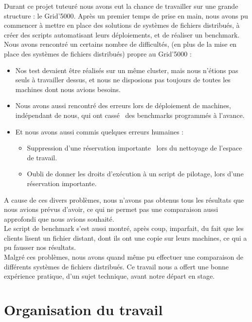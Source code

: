 \documentclass[12pt]{report}
\begin{document}
	Durant ce projet tuteuré nous avons eut la chance de travailler sur une grande structure : le Grid'5000.
	Après un premier temps de prise en main, nous avons pu commencer à mettre en place des solutions de systèmes de fichiers distribués,
	à créer des scripts automatisant leurs déploiements, et de réaliser un benchmark.\\

	Nous avons rencontré un certains nombre de difficultés, (en plus de la mise en place des systèmes de fichiers distribués) propre au Grid'5000 :
	\begin{itemize}
		\item Nos test devaient être réalisés sur un même cluster, mais nous n'étions pas seuls à travailler dessus,
		et nous ne disposions pas toujours de toutes les machines dont nous avions besoins.
		\item Nous avons aussi rencontré des erreurs lors de déploiement de machines, indépendant de nous, qui ont \og cassé\fg~ des benchmarks programmés à l'avance.
		\item Et nous avons aussi commis quelques erreurs humaines :
		\begin{itemize}
			\item Suppression d'une réservation \og importante\fg~ lors du nettoyage de l'espace de travail.
			\item Oubli de donner les droits d'exécution à un script de pilotage, lors d'une réservation \og importante\fg.\\
		\end{itemize}
	\end{itemize}

	A cause de ces divers problèmes, nous n'avons pas obtenus tous les résultats que nous avions prévus d'avoir, ce qui ne permet pas une comparaison aussi approfondi que nous avions souhaité.\\

	Le script de benchmark s'est aussi montré, après coup, imparfait, du fait que les clients lisent un fichier distant, dont ils ont une copie sur leurs machines, ce qui a pu fausser nos résultats.\\

	Malgré ces problèmes, nous avons quand même pu effectuer une comparaison de différents systèmes de fichiers distribués.
	Ce travail nous a offert une bonne expérience pratique, d'un sujet technique, avant notre départ en stage.

	\appendix
		\chapter{Organisation du travail}
\end{document}
